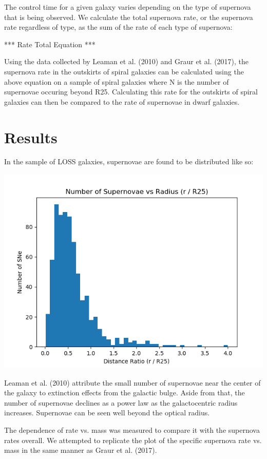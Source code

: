 \documentclass[apj]{emulateapj}
\begin{document}
The control time for a given galaxy varies depending on the type of supernova that is being observed. We calculate the total supernova rate, or the supernova rate regardless of type, as the sum of the rate of each type of supernova:

*** Rate Total Equation ***

Using the data collected by Leaman et al. (2010) and Graur et al. (2017), the supernova rate in the outskirts of spiral galaxies can be calculated using the above equation on a sample of spiral galaxies where N is the number of supernovae occuring beyond R25. Calculating this rate for the outskirts of spiral galaxies can then be compared to the rate of supernovae in dwarf galaxies.

\section{Results}

In the sample of LOSS galaxies, supernovae are found to be distributed like so:

\includegraphics[scale=0.5]{sne_vs_radius}

Leaman et al. (2010) attribute the small number of supernovae near the center of the galaxy to extinction effects from the galactic bulge. Aside from that, the number of supernovae declines as a power law as the galactocentric radius increases. Supernovae can be seen well beyond the optical radius.

The dependence of rate vs. mass was measured to compare it with the supernova rates overall. We attempted to replicate the plot of the specific supernova rate vs. mass in the same manner as Graur et al. (2017).
\end{document}
